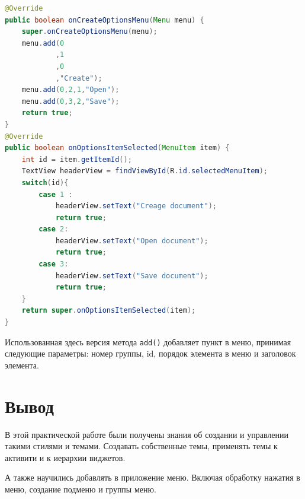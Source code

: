 \begin{lstlisting}[language=Java
	, label=lst:java:submenu
	]
@Override
public boolean onCreateOptionsMenu(Menu menu) {
	super.onCreateOptionsMenu(menu);
	menu.add(0
			,1
			,0
			,"Create");
	menu.add(0,2,1,"Open");
	menu.add(0,3,2,"Save");
	return true;
}
@Override
public boolean onOptionsItemSelected(MenuItem item) {
	int id = item.getItemId();
	TextView headerView = findViewById(R.id.selectedMenuItem);
	switch(id){
		case 1 :
			headerView.setText("Creage document");
			return true;
		case 2:
			headerView.setText("Open document");
			return true;
		case 3:
			headerView.setText("Save document");
			return true;
	}
	return super.onOptionsItemSelected(item);
}
\end{lstlisting}

Использованная здесь версия метода \texttt{add()} добавляет пункт в меню,
принимая следующие параметры: номер группы, id, порядок элемента в меню и
заголовок элемента.

\clearpage

\section*{\LARGE{Вывод}}
В этой практической работе были получены знания об создании и управлении
такими стилями и темами. Создавать собственные темы, применять темы к
активити и к иерархии виджетов.\par
А также научились добавлять в приложение меню. Включая обработку нажатия
в меню, создание подменю и группы меню.

